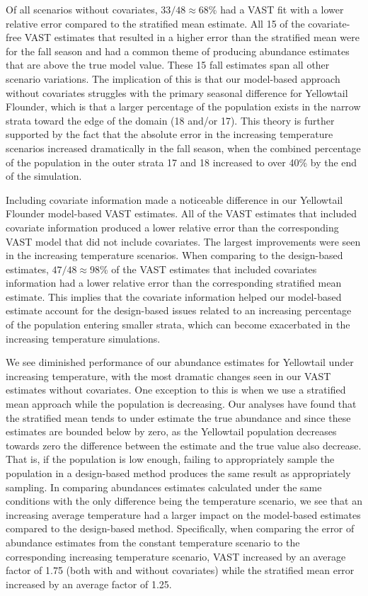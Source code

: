 \documentclass[
  12pt,
]{article}
\begin{document}
Of all scenarios without covariates, \(33/48\approx68\)\% had a VAST fit with a lower relative error compared to the stratified mean estimate. All 15 of the covariate-free VAST estimates that resulted in a higher error than the stratified mean were for the fall season and had a common theme of producing abundance estimates that are above the true model value. These 15 fall estimates span all other scenario variations. The implication of this is that our model-based approach without covariates struggles with the primary seasonal difference for Yellowtail Flounder, which is that a larger percentage of the population exists in the narrow strata toward the edge of the domain (18 and/or 17). This theory is further supported by the fact that the absolute error in the increasing temperature scenarios increased dramatically in the fall season, when the combined percentage of the population in the outer strata 17 and 18 increased to over 40\% by the end of the simulation.

Including covariate information made a noticeable difference in our Yellowtail Flounder model-based VAST estimates. All of the VAST estimates that included covariate information produced a lower relative error than the corresponding VAST model that did not include covariates. The largest improvements were seen in the increasing temperature scenarios. When comparing to the design-based estimates, \(47/48\approx98\)\% of the VAST estimates that included covariates information had a lower relative error than the corresponding stratified mean estimate. This implies that the covariate information helped our model-based estimate account for the design-based issues related to an increasing percentage of the population entering smaller strata, which can become exacerbated in the increasing temperature simulations.

We see diminished performance of our abundance estimates for Yellowtail under increasing temperature, with the most dramatic changes seen in our VAST estimates without covariates. One exception to this is when we use a stratified mean approach while the population is decreasing. Our analyses have found that the stratified mean tends to under estimate the true abundance and since these estimates are bounded below by zero, as the Yellowtail population decreases towards zero the difference between the estimate and the true value also decrease. That is, if the population is low enough, failing to appropriately sample the population in a design-based method produces the same result as appropriately sampling. In comparing abundances estimates calculated under the same conditions with the only difference being the temperature scenario, we see that an increasing average temperature had a larger impact on the model-based estimates compared to the design-based method. Specifically, when comparing the error of abundance estimates from the constant temperature scenario to the corresponding increasing temperature scenario, VAST increased by an average factor of 1.75 (both with and without covariates) while the stratified mean error increased by an average factor of 1.25.
\end{document}
